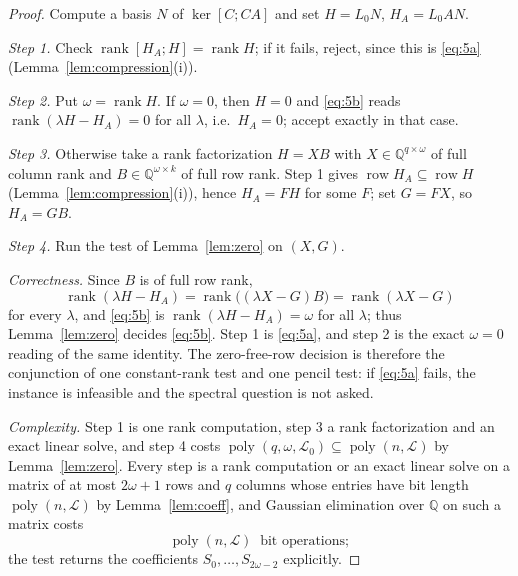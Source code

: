 \documentclass[journal]{IEEEtran}
\theoremstyle{plainn}
\theoremstyle{remark}
\begin{document}
\begin{proof}
Compute a basis $N$ of $\ker[C;CA]$ and set $H=L_0N$, $H_A=L_0AN$.

\emph{Step 1.} Check $\operatorname{rank}[H_A;H]=\operatorname{rank}H$; if it
fails, reject, since this is \eqref{eq:5a}
(Lemma~\ref{lem:compression}(i)).

\emph{Step 2.} Put $\omega=\operatorname{rank}H$. If $\omega=0$, then $H=0$ and
\eqref{eq:5b} reads $\operatorname{rank}(\lambda H-H_A)=0$ for all $\lambda$,
i.e.\ $H_A=0$; accept exactly in that case.

\emph{Step 3.} Otherwise take a rank factorization $H=XB$ with
$X\in\mathbb Q^{q\times\omega}$ of full column rank and
$B\in\mathbb Q^{\omega\times k}$ of full row rank. Step 1 gives
$\operatorname{row}H_A\subseteq\operatorname{row}H$
(Lemma~\ref{lem:compression}(i)), hence $H_A=FH$ for some $F$; set $G=FX$, so
$H_A=GB$.

\emph{Step 4.} Run the test of Lemma~\ref{lem:zero} on $(X,G)$.

\emph{Correctness.} Since $B$ is of full row rank,
\begin{equation*}
\operatorname{rank}(\lambda H-H_A)
=\operatorname{rank}\bigl((\lambda X-G)B\bigr)
=\operatorname{rank}(\lambda X-G)
\end{equation*}
for every $\lambda$, and \eqref{eq:5b} is
$\operatorname{rank}(\lambda H-H_A)=\omega$ for all $\lambda$; thus
Lemma~\ref{lem:zero} decides \eqref{eq:5b}. Step 1 is \eqref{eq:5a}, and step 2
is the exact $\omega=0$ reading of the same identity. The zero-free-row decision
is therefore the conjunction of one constant-rank test and one pencil test: if
\eqref{eq:5a} fails, the instance is infeasible and the spectral question is not
asked.

\emph{Complexity.} Step 1 is one rank computation, step 3 a rank factorization
and an exact linear solve, and step 4 costs
$\operatorname{poly}(q,\omega,\mathcal L_0)\subseteq\operatorname{poly}(n,\mathcal L)$
by Lemma~\ref{lem:zero}. Every step is a rank computation or an exact linear
solve on a matrix of at most $2\omega+1$ rows and $q$ columns whose entries have
bit length $\operatorname{poly}(n,\mathcal L)$ by Lemma~\ref{lem:coeff}, and
Gaussian elimination over $\mathbb Q$ on such a matrix costs
\begin{equation*}
\operatorname{poly}(n,\mathcal L)\ \text{ bit operations};
\end{equation*}
the test returns the coefficients $S_0,\dots,S_{2\omega-2}$ explicitly.
\end{proof}
\end{document}
